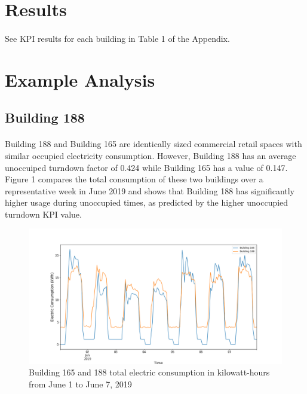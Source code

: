 \documentclass[a4paper]{article}
\begin{document}
\section{Results}

\paragraph{}
See KPI results for each building in Table 1 of the Appendix.

\section{Example Analysis}

\subsection{Building 188}

\paragraph{}
Building 188 and Building 165 are identically sized commercial retail spaces with similar occupied electricity consumption. However, Building 188 has an average unoccuiped turndown factor of 0.424 while Building 165 has a value of 0.147. Figure 1 compares the total consumption of these two buildings over a representative week in June 2019 and shows that Building 188 has significantly higher usage during unoccupied times, as predicted by the higher unoccupied turndown KPI value.

\begin{figure}[H]
\centering
\includegraphics[width=.9\columnwidth]{./images/188v165_Turndown.png}
\caption{Building 165 and 188 total electric consumption in kilowatt-hours from June 1 to June 7, 2019}
\end{figure}
\end{document}
